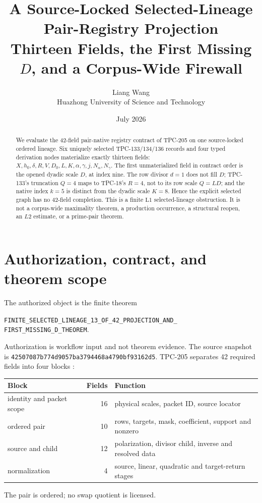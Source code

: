 \documentclass[11pt]{article}
\title{\textbf{A Source-Locked Selected-Lineage\\
Pair-Registry Projection}\\
\large Thirteen Fields, the First Missing \(D\), and a Corpus-Wide Firewall}
\author{Liang Wang\\Huazhong University of Science and Technology}
\date{July 2026}
\newcommand{\code}[1]{\nolinkurl{#1}}
\newcommand{\Lone}{\mathrm{L1}}
\begin{document}
\maketitle

\begin{abstract}
We evaluate the 42-field pair-native registry contract of TPC-205 on one
source-locked ordered lineage.  Six uniquely selected TPC-133/134/136
records and four typed derivation nodes materialize exactly thirteen fields:
\(X,h_0,\delta,R,V,D_0,L,K,\alpha,\gamma,j,N_\alpha,N_\gamma\).
The first unmaterialized field in contract order is the opened dyadic scale
\(D\), at index nine.  The row divisor \(d=1\) does not fill \(D\);
TPC-133's truncation \(Q=4\) maps to TPC-18's \(R=4\), not to its row scale
\(Q=LD\); and the native index \(k=5\) is distinct from the dyadic scale
\(K=8\).  Hence the explicit selected graph has no 42-field completion.
This is a finite \(\Lone\) selected-lineage obstruction.  It is not a
corpus-wide maximality theorem, a production occurrence, a structural
reopen, an \(L2\) estimate, or a prime-pair theorem.
\end{abstract}

\section{Authorization, contract, and theorem scope}

The authorized object is the finite theorem
\begin{center}
\small
\code{FINITE_SELECTED_LINEAGE_13_OF_42_PROJECTION_AND_}\\
\code{FIRST_MISSING_D_THEOREM}.
\end{center}
Authorization is workflow input and not theorem evidence.  The source
snapshot is
\code{42507087b774d9057ba3794468a4790bf93162d5}.
TPC-205 separates 42 required fields into four blocks
\citep{WangTPC205}:
\begin{center}
\small
\begin{tabularx}{0.92\linewidth}{@{}l r Y@{}}
\toprule
Block & Fields & Function\\
\midrule
identity and packet scope & 16 & physical scales, packet ID, source locator\\
ordered pair & 10 & rows, targets, mask, coefficient, support and nonzero\\
source and child & 12 & polarization, divisor child, inverse and resolved data\\
normalization & 4 & source, linear, quadratic and target-return stages\\
\bottomrule
\end{tabularx}
\end{center}
The pair is ordered; no swap quotient is licensed.
\end{document}
